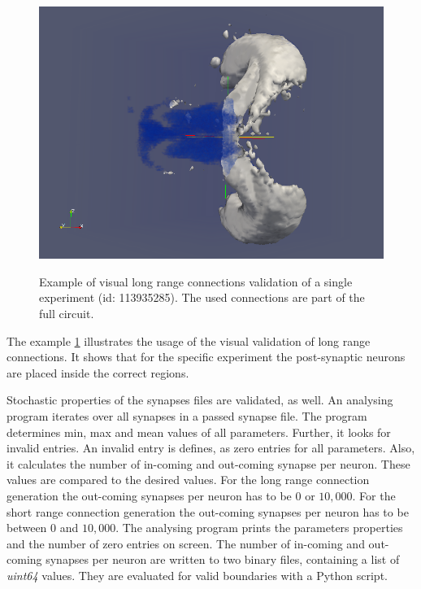 \begin{figure}[ht!]
\begin{center}
{            \includegraphics[scale=0.15]{pictures/exp1_post_contour.png}
       }
    \end{center}
    	\caption{%
        Example of visual long range connections validation of a single experiment (id: 113935285).
        The used connections are part of the full circuit.
     }%
   \label{fig:longrangevalidation}
   \end{figure}
   
The example \ref{fig:longrangevalidation} illustrates the usage of the visual validation of long range connections.
It shows that for the specific experiment the post-synaptic neurons are placed inside the correct regions.

Stochastic properties of the synapses files are validated, as well.
An analysing program iterates over all synapses in a passed synapse file.
The program determines min, max and mean values of all parameters.
Further, it looks for invalid entries. An invalid entry is defines, as
zero entries for all parameters. Also, it calculates the number of in-coming
and out-coming synapse per neuron. These values are compared to the desired values.
For the long range connection generation the out-coming synapses per neuron has to be
$0$ or $10,000$. For the short range connection generation the out-coming synapses per neuron
has to be between $0$ and $10,000$. The analysing program prints the parameters properties 
and the number of zero entries on screen. The number of in-coming and out-coming 
synapses per neuron are written to two binary files, containing a list of \emph{uint64} values.
They are evaluated for valid boundaries with a Python script.



